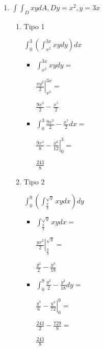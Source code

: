 \documentclass[../practica_08.tex]{subfiles}
\begin{document}
\begin{enumerate}
        \item $ \int \int_D xy dA, D y=x^2, y=3x$

            \begin{enumerate}
                \item Tipo 1
                
                    $\int_0^3 (\int_{x^2}^{3x} xy dy)dx$

                    \begin{itemize}
                        \item $ \int_{x^2}^{3x} xy dy = $
                        
                            $ \left. \frac{xy^2}{2}  \right |_{x^2}^{3x} =$

                            $ \frac{9x^3}{2} - \frac{x^5}{2} $

                        \item $ \int_0^3 \frac{9x^3}{2} - \frac{x^5}{2} dx = $
                        
                            $\left. \frac{9x^4}{8} - \frac{x^6}{12} \right |_0^3 = $

                            $ \frac{243}{8} $

                    \end{itemize}

                \item Tipo 2
                
                    $\int_0^9 (\int_{\frac{y}{3}}^{\sqrt{y}} xy dx) dy$

                    \begin{itemize}
                        \item $ \int_{\frac{y}{3}}^{\sqrt{y}} xy dx =$
                        
                            $\left. \frac{yx^2}{2} \right |_{\frac{y}{3}}^{\sqrt{y}} = $

                            $ \frac{y^2}{2} - \frac{y^3}{18} $
                        
                        \item $ \int_0^9 \frac{y^2}{2} - \frac{y^3}{18} dy =$
                        
                            $ \left. \frac{y^3}{6} - \frac{y^4}{72} \right |_0^9 = $

                            $ \frac{243}{2} - \frac{729}{8} = $

                            $\frac{243}{8}$

                    \end{itemize}

            \end{enumerate}

    \end{enumerate}
\end{document}
